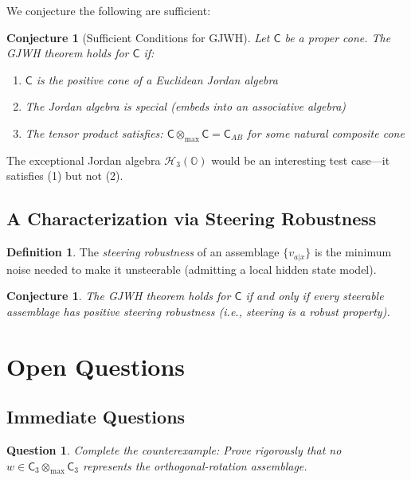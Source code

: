 \documentclass[11pt,a4paper]{article}
\newtheorem{conjecture}[theorem]{Conjecture}
\newtheorem{question}[theorem]{Question}
\theoremstyle{definition}
\newtheorem{definition}[theorem]{Definition}
\newcommand{\C}{\mathsf{C}}
\newcommand{\tmax}{\otimes_{\max}}
\begin{document}
We conjecture the following are sufficient:

\begin{conjecture}[Sufficient Conditions for GJWH]
Let $\C$ be a proper cone. The GJWH theorem holds for $\C$ if:
\begin{enumerate}
    \item $\C$ is the positive cone of a Euclidean Jordan algebra
    \item The Jordan algebra is \emph{special} (embeds into an associative algebra)
    \item The tensor product satisfies: $\C \tmax \C = \C_{AB}$ for some natural composite cone
\end{enumerate}
\end{conjecture}

The exceptional Jordan algebra $\mathcal{H}_3(\mathbb{O})$ would be an interesting test case---it satisfies (1) but not (2).

\subsection{A Characterization via Steering Robustness}

\begin{definition}
The \emph{steering robustness} of an assemblage $\{v_{a|x}\}$ is the minimum noise needed to make it unsteerable (admitting a local hidden state model).
\end{definition}

\begin{conjecture}
The GJWH theorem holds for $\C$ if and only if every steerable assemblage has positive steering robustness (i.e., steering is a robust property).
\end{conjecture}

\section{Open Questions}

\subsection{Immediate Questions}

\begin{question}
Complete the counterexample: Prove rigorously that no $w \in \C_3 \tmax \C_3$ represents the orthogonal-rotation assemblage.
\end{question}
\end{document}
